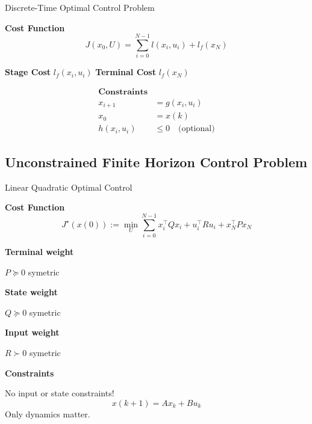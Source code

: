 
\begin{sstTitleBox}{
		Discrete-Time Optimal Control Problem
	}
	\begin{sstOnlyFrame}
		\textbf{Cost Function}
		\vspace{-3mm}
		\begin{equation}
			J(x_0,U)= \sum_{i=0}^{N-1} l(x_i,u_i) + l_f(x_N)
		\end{equation}
		\begin{minipage}[t]{0.25\linewidth}
			\textbf{Stage Cost}
			$l_f(x_i,u_i)$
			\textbf{Terminal Cost}
			$l_f(x_N)$
		\end{minipage}
		\begin{minipage}[t]{0.59\linewidth}
			\vspace{-5.5mm}
			\begin{align*}
				\textbf{Constraints}                      \\
				x_{i+1}    & = g(x_i,u_i)                 \\
				x_0        & = x(k)                       \\
				h(x_i,u_i) & \le 0 \quad\text{(optional)}
			\end{align*}
		\end{minipage}
	\end{sstOnlyFrame}
\end{sstTitleBox}

\subsection{Unconstrained Finite Horizon Control Problem}

\begin{sstTitleBox}
	{Linear Quadratic Optimal Control}
	\begin{sstOnlyFrame}
		\textbf{Cost Function}
		\vspace{-3mm}
		\begin{equation}
			J^\star(x(0)) := \min_U
			\sum_{i=0}^{N-1}
			x_i^\top Q x_i + u_i^\top R u_i
			+x_N^\top P x_N
			\label{oc:lq-oc}
		\end{equation}

		\vspace{-2mm}
		\begin{minipage}[t]{0.33\linewidth}
			\textbf{Terminal weight}

			$P\succeq0$ symetric

			\textbf{State weight}

			$Q\succeq0$ symetric

			\textbf{Input weight}

			$R\succ0$ symetric
		\end{minipage}
		\begin{minipage}[t]{0.49\linewidth}
			\textbf{Constraints}

			No input or state constraints!
			\[
				x(k+1)=Ax_k+Bu_k
			\]
			Only dynamics matter.
		\end{minipage}

	\end{sstOnlyFrame}
\end{sstTitleBox}

